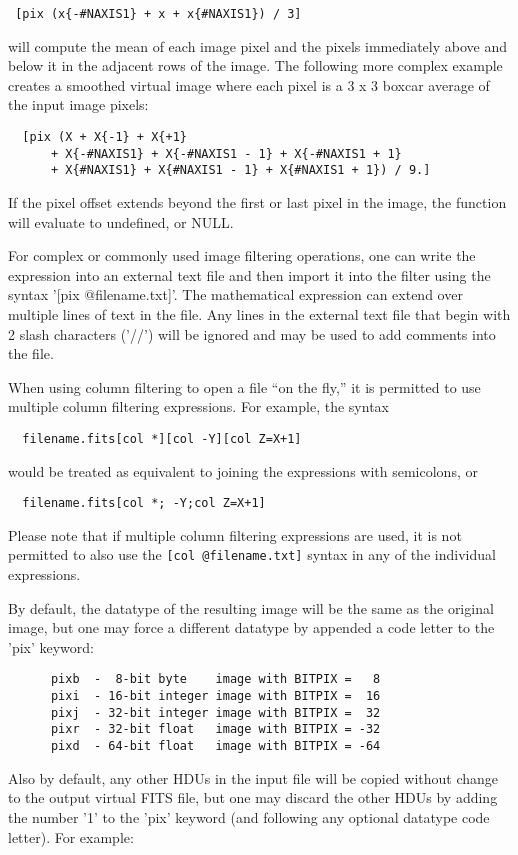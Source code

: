 \documentclass[11pt]{book}
\begin{document}
\begin{verbatim}
 [pix (x{-#NAXIS1} + x + x{#NAXIS1}) / 3]
\end{verbatim}
will compute the mean of each image pixel and the pixels immediately
above and below it in the adjacent rows of the image.
The following more complex example
creates a smoothed virtual image where each pixel
is a 3 x 3 boxcar average of the input image pixels:

\begin{verbatim}
  [pix (X + X{-1} + X{+1}
      + X{-#NAXIS1} + X{-#NAXIS1 - 1} + X{-#NAXIS1 + 1}
      + X{#NAXIS1} + X{#NAXIS1 - 1} + X{#NAXIS1 + 1}) / 9.]
\end{verbatim}
If the pixel offset
extends beyond the first or last pixel in the image, the function will
evaluate to undefined, or NULL.

For  complex  or commonly used image filtering operations,
one  can  write the expression into an external text  file and
then import it  into the
filter using  the syntax '[pix @filename.txt]'.   The mathematical
expression can
extend over multiple lines of text in the  file.
Any lines in the external text file
that begin with 2 slash characters ('//') will be ignored and may be
used to add comments into the file.

When using column filtering to open a file ``on the fly,'' it is permitted
to use multiple column filtering expressions.  For example, the
syntax
\begin{verbatim}
  filename.fits[col *][col -Y][col Z=X+1]
\end{verbatim}
would be treated as equivalent to joining the expressions with semicolons, 
or
\begin{verbatim}
  filename.fits[col *; -Y;col Z=X+1]
\end{verbatim}
Please note that if multiple column filtering expressions are used, it is
not permitted to also use the \verb+[col @filename.txt]+ syntax in any
of the individual expressions.

By default, the datatype of the resulting image will be the same as
the original image, but one may force a different datatype by appended
a code letter to the 'pix' keyword:

\begin{verbatim}
      pixb  -  8-bit byte    image with BITPIX =   8
      pixi  - 16-bit integer image with BITPIX =  16
      pixj  - 32-bit integer image with BITPIX =  32
      pixr  - 32-bit float   image with BITPIX = -32
      pixd  - 64-bit float   image with BITPIX = -64
\end{verbatim}
Also by default, any other HDUs in the input file will be copied without
change to the
output virtual FITS file, but one may discard the other HDUs by adding
the number '1' to the 'pix' keyword (and following any optional datatype code
letter).  For example:
\end{document}
